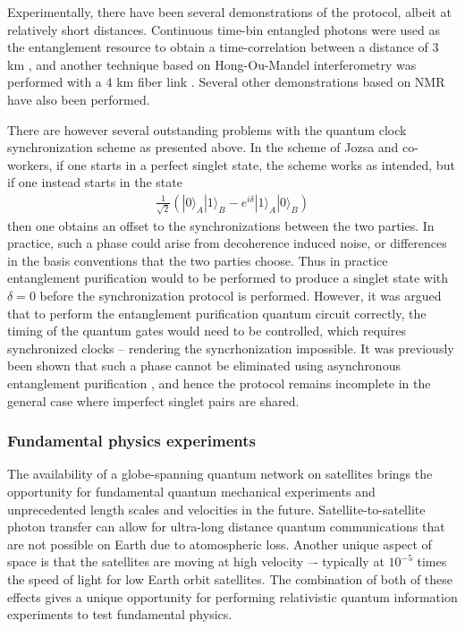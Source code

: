 \documentclass[aps,rmp,reprint,amsmath,amssymb,graphicx,longbibliography]{revtex4-1}
\begin{document}
Experimentally, there have been several demonstrations of the protocol, albeit at relatively short distances.  Continuous time-bin entangled photons were used as the entanglement resource to obtain a time-correlation between a distance of 3 km \cite{valencia2004distant}, and another technique based on Hong-Ou-Mandel interferometry was performed with a 4 km fiber link \cite{quan2016demonstration}.  Several other demonstrations based on NMR \cite{zhang2004nuclear,kong2017implementation} have also been performed. 

There are however several outstanding problems with the quantum clock synchronization scheme as presented above. In the scheme of Jozsa and co-workers, if one starts in a perfect singlet state, the scheme works as intended, but if one instead starts in the state 
%
\begin{align}
\frac{1}{\sqrt{2}} \left( | 0 \rangle_A | 1 \rangle_B - e^{i \delta} | 1 \rangle_A | 0 \rangle_B \right)
\end{align}
%
then one obtains an offset to the synchronizations between the two parties. In practice, such a phase could arise from decoherence induced noise, or differences in the basis conventions that the two parties choose. Thus in practice entanglement purification would to be performed to produce a singlet state with $ \delta = 0 $ before the synchronization protocol is performed.  However, it was argued that to perform the entanglement purification quantum circuit correctly, the timing of the quantum gates would need to be controlled, which requires synchronized clocks \cite{preskill2000quantum} --  rendering the syncrhonization impossible. It was previously been shown that such a phase cannot be eliminated using asynchronous entanglement purification \cite{yurtsever02}, and hence the protocol remains incomplete in the general case where imperfect singlet pairs are shared. 








\subsubsection{Fundamental physics experiments}

The availability of a globe-spanning quantum network on satellites brings the opportunity for fundamental quantum mechanical experiments and unprecedented length scales and velocities in the future.  Satellite-to-satellite photon transfer can allow for ultra-long distance quantum communications that are not possible on Earth due to atomospheric loss.  Another unique aspect of space is that the satellites are moving at high velocity –- typically at $10^{-5} $ times the speed of light for low Earth orbit satellites.  The combination of both of these effects gives a unique opportunity for performing relativistic quantum information experiments to test fundamental physics. 
\end{document}
